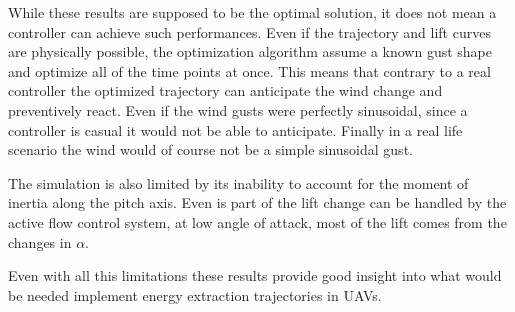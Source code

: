
    \par While these results are supposed to be the optimal solution, it does not mean a controller can achieve such performances.
    Even if the trajectory and lift curves are physically possible, the optimization algorithm assume a known gust shape and optimize all of the time points at once.
    This means that contrary to a real controller the optimized trajectory can anticipate the wind change and preventively react.
    Even if the wind gusts were perfectly sinusoidal, since a controller is casual it would not be able to anticipate.
    Finally in a real life scenario the wind would of course not be a simple sinusoidal gust.

    \par The simulation is also limited by its inability to account for the moment of inertia along the pitch axis.
    Even is part of the lift change can be handled by the active flow control system, at low angle of attack, most of the lift comes from the changes in $\alpha$.

    \par Even with all this limitations these results provide good insight into what would be needed implement energy extraction trajectories in UAVs.


